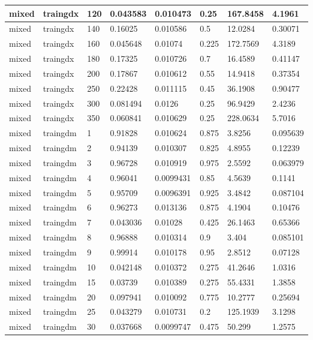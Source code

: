 \begin{longtable}{llllllll}
mixed & traingdx & 120 & 0.043583 & 0.010473 & 0.25 & 167.8458 & 4.1961 \\ \hline 
mixed & traingdx & 140 & 0.16025 & 0.010586 & 0.5 & 12.0284 & 0.30071 \\ \hline 
mixed & traingdx & 160 & 0.045648 & 0.01074 & 0.225 & 172.7569 & 4.3189 \\ \hline 
mixed & traingdx & 180 & 0.17325 & 0.010726 & 0.7 & 16.4589 & 0.41147 \\ \hline 
mixed & traingdx & 200 & 0.17867 & 0.010612 & 0.55 & 14.9418 & 0.37354 \\ \hline 
mixed & traingdx & 250 & 0.22428 & 0.011115 & 0.45 & 36.1908 & 0.90477 \\ \hline 
mixed & traingdx & 300 & 0.081494 & 0.0126 & 0.25 & 96.9429 & 2.4236 \\ \hline 
mixed & traingdx & 350 & 0.060841 & 0.010629 & 0.25 & 228.0634 & 5.7016 \\ \hline 
mixed & traingdm & 1 & 0.91828 & 0.010624 & 0.875 & 3.8256 & 0.095639 \\ \hline 
mixed & traingdm & 2 & 0.94139 & 0.010307 & 0.825 & 4.8955 & 0.12239 \\ \hline 
mixed & traingdm & 3 & 0.96728 & 0.010919 & 0.975 & 2.5592 & 0.063979 \\ \hline 
mixed & traingdm & 4 & 0.96041 & 0.0099431 & 0.85 & 4.5639 & 0.1141 \\ \hline 
mixed & traingdm & 5 & 0.95709 & 0.0096391 & 0.925 & 3.4842 & 0.087104 \\ \hline 
mixed & traingdm & 6 & 0.96273 & 0.013136 & 0.875 & 4.1904 & 0.10476 \\ \hline 
mixed & traingdm & 7 & 0.043036 & 0.01028 & 0.425 & 26.1463 & 0.65366 \\ \hline 
mixed & traingdm & 8 & 0.96888 & 0.010314 & 0.9 & 3.404 & 0.085101 \\ \hline 
mixed & traingdm & 9 & 0.99914 & 0.010178 & 0.95 & 2.8512 & 0.07128 \\ \hline 
mixed & traingdm & 10 & 0.042148 & 0.010372 & 0.275 & 41.2646 & 1.0316 \\ \hline 
mixed & traingdm & 15 & 0.03739 & 0.010389 & 0.275 & 55.4331 & 1.3858 \\ \hline 
mixed & traingdm & 20 & 0.097941 & 0.010092 & 0.775 & 10.2777 & 0.25694 \\ \hline 
mixed & traingdm & 25 & 0.043279 & 0.010731 & 0.2 & 125.1939 & 3.1298 \\ \hline 
mixed & traingdm & 30 & 0.037668 & 0.0099747 & 0.475 & 50.299 & 1.2575 \\ \hline 

\end{longtable}
